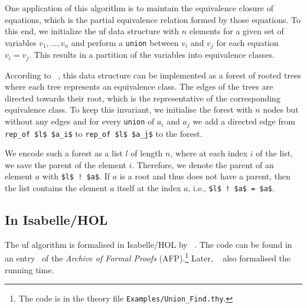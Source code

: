 \documentclass[
  sigplan,
  10pt,
  anonymous,
  review,
  ]{acmart}
\begin{document}
One application of this algorithm is to maintain the equivalence closure of equations, which is the partial equivalence relation formed by those equations.
To this end, we initialize the \acrshort{uf} data structure with $n$ elements for a given set of variables $v_1, \ldots, v_n$ and perform a \lstinline!union! between $v_i$ and $v_j$ for each equation $v_i = v_j$.
This results in a partition of the variables into equivalence classes.

According to \citeauthor{unionfind_tarjan}~\cite{unionfind_tarjan}, this data structure can be implemented as a forest of rooted trees where each tree represents an equivalence class.
The edges of the trees are directed towards their root, which is the representative of the corresponding equivalence class.
To keep this invariant, we initialise the forest with $n$ nodes but without any edges and for every \lstinline!union! of $a_i$ and $a_j$ we add a directed edge from \lstinline!rep_of $l$ $a_i$! to \lstinline!rep_of $l$ $a_j$! to the forest.

We encode such a forest as a list $l$ of length $n$, where at each index $i$ of the list, we save the parent of the element $i$.
Therefore, we denote the parent of an element $a$ with \lstinline|$l$ ! $a$|.
If $a$ is a root and thus does not have a parent, then the list contains the element $a$ itself at the index $a$, i.e., \lstinline|$l$ ! $a$ = $a$|.


\subsection{In Isabelle/HOL}
The \acrshort{uf} algorithm is formalised in Isabelle/HOL by \citeauthor{unionfind_isabelle}~\cite{unionfind_isabelle}.
The code can be found in an entry~\cite{union_find_afp} of the \emph{Archive of Formal Proofs} (AFP).\footnote{The code is in the theory file \texttt{Examples/Union\_Find.thy}.}
Later, \citeauthor{union_find_imp_hol}~\cite{union_find_imp_hol} also formalised the running time.
\end{document}
